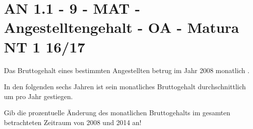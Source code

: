\section{AN 1.1 - 9 - MAT - Angestelltengehalt - OA - Matura NT 1 16/17}

\begin{beispiel}[AN 1.1]{1} %
Das Bruttogehalt eines bestimmten Angestellten betrug im Jahr 2008 monatlich .

In den folgenden sechs Jahren ist sein monatliches Bruttogehalt durchschnittlich um  pro Jahr gestiegen.

Gib die prozentuelle Änderung des monatlichen Bruttogehalts im gesamten betrachteten Zeitraum von 2008 und 2014 an!


\end{beispiel}